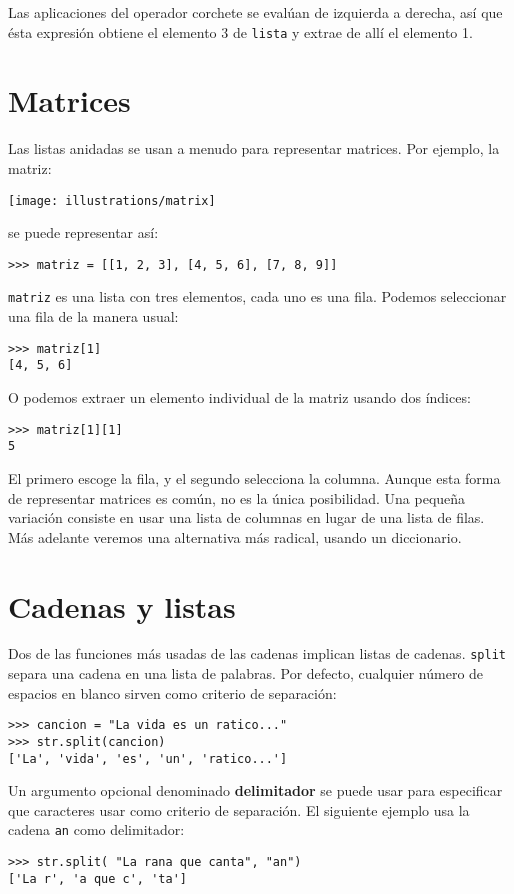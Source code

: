 Las aplicaciones del operador corchete se evalúan de izquierda a derecha,
así que ésta expresión obtiene el elemento 3 de \texttt{lista} y extrae
de allí el elemento 1.

\section{Matrices}

 

Las listas anidadas se usan a menudo para representar matrices. Por
ejemplo, la matriz:

\beforefig \centerline{\texttt{[image: illustrations/matrix]}}
\afterfig

se puede representar así:
\begin{lstlisting}
>>> matriz = [[1, 2, 3], [4, 5, 6], [7, 8, 9]]
\end{lstlisting}

\texttt{matriz} es una lista con tres elementos, cada uno es una fila.
Podemos seleccionar una fila de la manera usual:
\begin{lstlisting}
>>> matriz[1]
[4, 5, 6]
\end{lstlisting}

O podemos extraer un elemento individual de la matriz usando dos índices:
\begin{lstlisting}
>>> matriz[1][1]
5
\end{lstlisting}

El primero escoge la fila, y el segundo selecciona la columna. Aunque
esta forma de representar matrices es común, no es la única posibilidad.
Una pequeña variación consiste en usar una lista de columnas en lugar
de una lista de filas. Más adelante veremos una alternativa más radical,
usando un diccionario.

  

\section{Cadenas y listas}

 

Dos de las funciones más usadas de las cadenas implican listas de
cadenas. \texttt{split} separa una cadena en una lista de palabras.
Por defecto, cualquier número de espacios en blanco sirven como criterio
de separación:
\begin{verbatim}
>>> cancion = "La vida es un ratico..."
>>> str.split(cancion)
['La', 'vida', 'es', 'un', 'ratico...']
\end{verbatim}
Un argumento opcional denominado \textbf{delimitador} se puede usar
para especificar que caracteres usar como criterio de separación.
El siguiente ejemplo usa la cadena \texttt{an} como delimitador:
\begin{lstlisting}
>>> str.split( "La rana que canta", "an")
['La r', 'a que c', 'ta']
\end{lstlisting}


